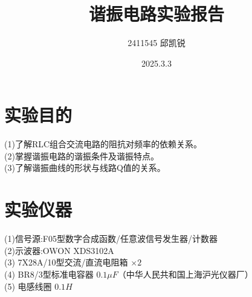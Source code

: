 \documentclass{article}
\title{谐振电路实验报告}
\author{2411545 邱凯锐}
\date{2025.3.3}
\begin{document}
\maketitle
\section{实验目的}
\hspace*{2em}(1)了解RLC组合交流电路的阻抗对频率的依赖关系。\\
\hspace*{2em}(2)掌握谐振电路的谐振条件及谐振特点。\\
\hspace*{2em}(3)了解谐振曲线的形状与线路Q值的关系。

\section{实验仪器}
\hspace*{2em}(1)信号源:F05型数字合成函数/任意波信号发生器/计数器\\
\hspace*{2em}(2)示波器:OWON XDS3102A\\
\hspace*{2em}(3) 7X28A/10型交流/直流电阻箱 $\times 2$\\
\hspace*{2em}(4) BR8/3型标准电容器 $0.1\mu F$（中华人民共和国上海沪光仪器厂）\\
\hspace*{2em}(5) 电感线圈 $0.1H$
\end{document}
